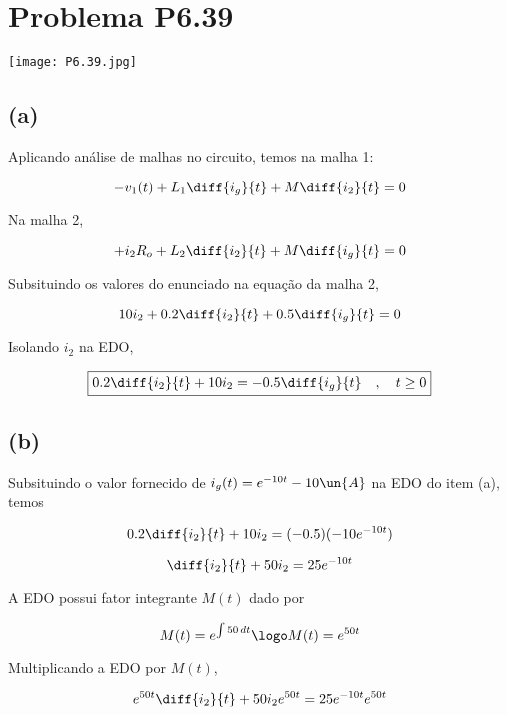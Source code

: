 
\section*{Problema P6.39}

\renewcommand*\thesection{6.39}

\begin{center}
    \texttt{[image: P6.39.jpg]}
\end{center}

\subsection*{(a)}

Aplicando análise de malhas no circuito, temos na malha 1:

\begin{equation}\label{eq:6.39.1}
    -v_1(t) + L_1\diff{i_g}{t} + M\diff{i_2}{t} = 0
\end{equation}

Na malha 2,

\begin{equation}\label{eq:6.39.2}
    +i_2R_o + L_2\diff{i_2}{t} + M\diff{i_g}{t} = 0
\end{equation}

Subsituindo os valores do enunciado na equação da malha 2,

\[ 10i_2 + 0.2\diff{i_2}{t} + 0.5\diff{i_g}{t} = 0 \]

Isolando $i_2$ na EDO, 

\[ \boxed{0.2\diff{i_2}{t} + 10i_2 = - 0.5\diff{i_g}{t} \quad , \quad t \geq 0}  \]

\subsection*{(b)}

Subsituindo o valor fornecido de $i_g(t) = e^{-10t} - 10 \un{A} $ na EDO do item (a), temos

\[ 0.2\diff{i_2}{t} + 10i_2 = (-0.5) (-10e^{-10t}) \]

\[ \diff{i_2}{t} + 50i_2 = 25e^{-10t} \]

A EDO possui fator integrante $M(t)$ dado por 

\[ M(t) = e^{\int 50 \,dt} \logo M(t) = e^{50t} \]

Multiplicando a EDO por $M(t)$,

\[ e^{50t}\diff{i_2}{t} + 50i_2e^{50t} =  25e^{-10t}e^{50t} \]

